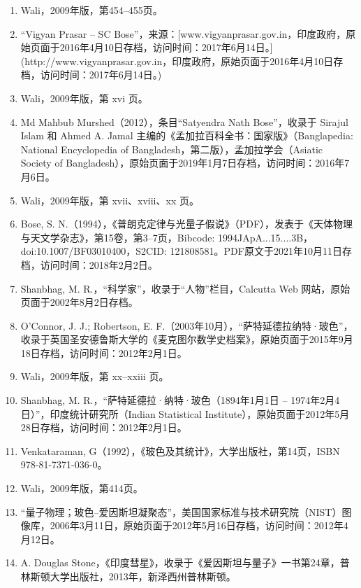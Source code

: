 \begin{enumerate}
\item Wali，2009年版，第454–455页。
\item “Vigyan Prasar – SC Bose”，来源：[www.vigyanprasar.gov.in，印度政府，原始页面于2016年4月10日存档，访问时间：2017年6月14日。](http://www.vigyanprasar.gov.in，印度政府，原始页面于2016年4月10日存档，访问时间：2017年6月14日。)
\item Wali，2009年版，第 xvi 页。
\item Md Mahbub Murshed（2012），条目“Satyendra Nath Bose”，收录于 Sirajul Islam 和 Ahmed A. Jamal 主编的《孟加拉百科全书：国家版》（Banglapedia: National Encyclopedia of Bangladesh，第二版），孟加拉学会（Asiatic Society of Bangladesh），原始页面于2019年1月7日存档，访问时间：2016年7月6日。
\item Wali，2009年版，第 xvii、xviii、xx 页。
\item Bose, S. N.（1994），《普朗克定律与光量子假说》（PDF），发表于《天体物理与天文学杂志》，第15卷，第3–7页，Bibcode: 1994JApA...15....3B，doi:10.1007/BF03010400，S2CID: 121808581。PDF原文于2021年10月11日存档，访问时间：2018年2月2日。
\item Shanbhag, M. R.，“科学家”，收录于“人物”栏目，Calcutta Web 网站，原始页面于2002年8月2日存档。
\item O'Connor, J. J.; Robertson, E. F.（2003年10月），“萨特延德拉纳特·玻色”，收录于英国圣安德鲁斯大学的《麦克图尔数学史档案》，原始页面于2015年9月18日存档，访问时间：2012年2月1日。
\item Wali，2009年版，第 xx–xxiii 页。
\item Shanbhag, M. R.，“萨特延德拉·纳特·玻色（1894年1月1日 – 1974年2月4日）”，印度统计研究所（Indian Statistical Institute），原始页面于2012年5月28日存档，访问时间：2012年2月1日。
\item Venkataraman, G（1992），《玻色及其统计》，大学出版社，第14页，ISBN 978-81-7371-036-0。
\item Wali，2009年版，第414页。
\item “量子物理；玻色–爱因斯坦凝聚态”，美国国家标准与技术研究院（NIST）图像库，2006年3月11日，原始页面于2012年5月16日存档，访问时间：2012年4月12日。
\item A. Douglas Stone，《印度彗星》，收录于《爱因斯坦与量子》一书第24章，普林斯顿大学出版社，2013年，新泽西州普林斯顿。


\end{enumerate}
